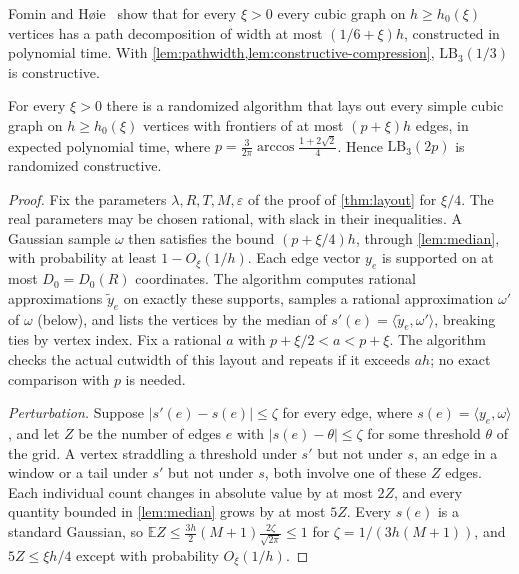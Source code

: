 \documentclass[11pt]{article}
\theoremstyle{plain}
\theoremstyle{definition}
\theoremstyle{remark}
\newcommand{\LB}{\mathrm{LB}}
\newcommand{\card}[1]{\lvert #1\rvert}
\begin{document}
Fomin and H{\o}ie~\cite{FominHoie2006} show that for every $\xi > 0$ every cubic graph on
$h \ge h_0(\xi)$ vertices has a path decomposition of width at most $(1/6 + \xi)h$, constructed
in polynomial time. With \cref{lem:pathwidth,lem:constructive-compression}, $\LB_3(1/3)$ is
constructive.

\begin{lemma}
\label{lem:sampling}
For every $\xi > 0$ there is a randomized algorithm that lays out every simple cubic graph on
$h \ge h_0(\xi)$ vertices with frontiers of at most $(p + \xi)h$ edges, in expected polynomial
time, where $p = \frac{3}{2\pi}\arccos\frac{1+2\sqrt2}{4}$. Hence $\LB_3(2p)$ is randomized
constructive.
\end{lemma}

\begin{proof}
Fix the parameters $\lambda, R, T, M, \varepsilon$ of the proof of \cref{thm:layout} for
$\xi/4$. The real parameters may be chosen rational, with slack in their inequalities.
A Gaussian sample $\omega$ then satisfies the bound $(p + \xi/4)h$, through
\cref{lem:median}, with probability at least $1 - O_\xi(1/h)$. Each edge vector $y_e$ is
supported on at most $D_0 = D_0(R)$ coordinates. The algorithm computes rational approximations
$\widetilde y_e$ on exactly these supports, samples a rational approximation $\omega'$ of
$\omega$ (below), and lists the vertices by the median of
$s'(e) = \langle\widetilde y_e,\omega'\rangle$, breaking ties by vertex index. Fix a rational
$a$ with $p+\xi/2<a<p+\xi$. The algorithm checks the actual cutwidth of this layout and repeats
if it exceeds $ah$; no exact comparison with $p$ is needed.

\emph{Perturbation.} Suppose $\card{s'(e) - s(e)} \le \zeta$ for every edge, where
$s(e) = \langle y_e, \omega\rangle$, and let $Z$ be the number of edges $e$ with
$\card{s(e) - \theta} \le \zeta$ for some threshold $\theta$ of the grid. A vertex straddling a
threshold under $s'$ but not under $s$, an edge in a window or a tail under $s'$ but not under
$s$, both involve one of these $Z$ edges. Each individual count changes in absolute value by
at most $2Z$, and every quantity bounded in \cref{lem:median} grows by at most $5Z$.
Every $s(e)$ is a standard Gaussian, so
$\mathbb E Z \le \frac{3h}{2}(M + 1)\frac{2\zeta}{\sqrt{2\pi}} \le 1$ for
$\zeta = 1/(3h(M+1))$, and $5Z \le \xi h/4$ except with probability $O_\xi(1/h)$.


\end{proof}
\end{document}
